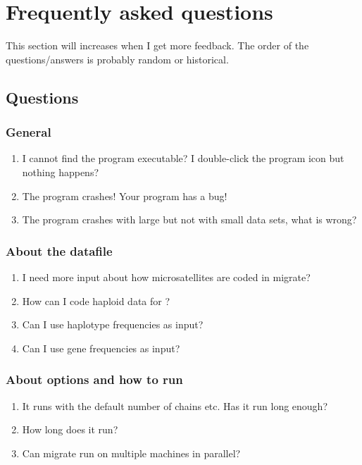 \chapter{Frequently asked questions}
This section will increases when I get more feedback.
The order of the questions/answers  is probably random or historical. 
\section{Questions}
\subsection{General}
\begin{enumerate}
\item I cannot find the program executable? I double-click the program icon but nothing happens?
\item The program crashes! Your program has a bug!
\item The program crashes with large but not with small data sets, 
what is wrong?
\end{enumerate}

\subsection{About the datafile}
\begin{enumerate}
\item I need more input about how microsatellites are coded in migrate?
\item How can I code haploid data for {\migrate}?
\item Can I use haplotype frequencies as input?
\item Can I use gene frequencies as input?
\end{enumerate}
\subsection{About options and how to run}
\begin{enumerate}
\item It runs with the default number of chains etc. Has it run
long enough?
\item How long does it run?
\item Can migrate run on multiple machines in parallel?
\end{enumerate}

